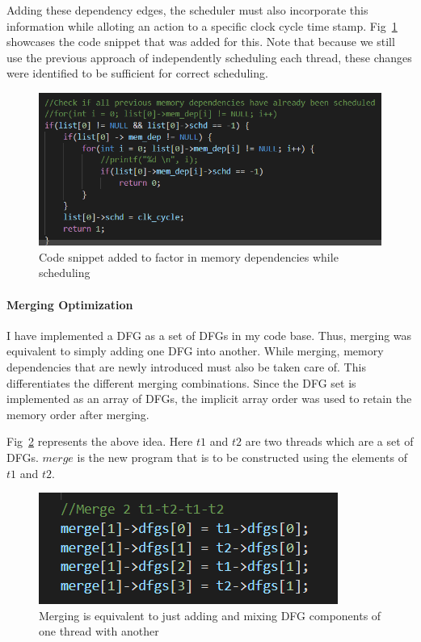             Adding these dependency edges, the scheduler must also incorporate this information while alloting an action to a specific clock cycle time stamp. 
            Fig~\ref{Schd} showcases the code snippet that was added for this. 
            Note that because we still use the previous approach of independently scheduling each thread, these changes were identified to be sufficient for correct scheduling. 
            \begin{figure}
                \centering
                \includegraphics[scale=0.5]{Schd.PNG}
                \caption{Code snippet added to factor in memory dependencies while scheduling}
                \label{Schd}
            \end{figure}

        \paragraph*{Merging Optimization}
    
        I have implemented a DFG as a set of DFGs in my code base.
        Thus, merging was equivalent to simply adding one DFG into another. 
        While merging, memory dependencies that are newly introduced must also be taken care of.
        This differentiates the different merging combinations.
        Since the DFG set is implemented as an array of DFGs, the implicit array order was used to retain the memory order after merging.
 
        Fig~\ref{merge} represents the above idea. 
        Here $t1$ and $t2$ are two threads which are a set of DFGs. 
        $merge$ is the new program that is to be constructed using the elements of $t1$ and $t2$. 
        \begin{figure}
            \centering
            \includegraphics[scale=0.5]{Merge.PNG}
            \caption{Merging is equivalent to just adding and mixing DFG components of one thread with another}
            \label{merge}
        \end{figure}

